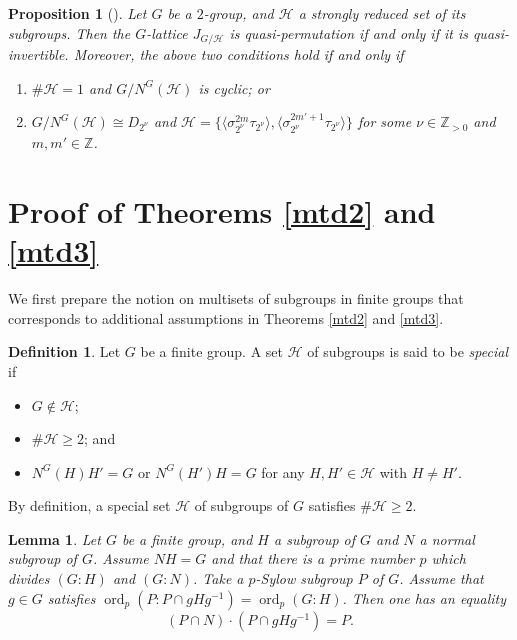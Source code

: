 \documentclass[12pt]{amsart}
\theoremstyle{plain}
\newtheorem{prop}[thm]{Proposition}
\newtheorem{lem}[thm]{Lemma}
\theoremstyle{definition}
\newtheorem{dfn}[thm]{Definition}
\numberwithin{thm}{section}
\numberwithin{equation}{section}
\newcommand{\Zpn}{\mathbb{Z}_{>0}}
\newcommand{\Z}{\mathbb{Z}}
\newcommand{\cH}{\mathcal{H}}
\DeclareMathOperator{\ord}{ord}
\begin{document}
\begin{prop}[{\cite[Theorem 7.16]{Hasegawa}}]\label{prop:tgqp}
Let $G$ be a $2$-group, and $\cH$ a strongly reduced set of its subgroups. Then the $G$-lattice $J_{G/\cH}$ is quasi-permutation if and only if it is quasi-invertible. Moreover, the above two conditions hold if and only if 
\begin{enumerate}
\item $\#\cH=1$ and $G/N^{G}(\cH)$ is cyclic; or
\item $G/N^{G}(\cH) \cong D_{2^{\nu}}$ and $\cH=\{\langle \sigma_{2^{\nu}}^{2m}\tau_{2^{\nu}} \rangle, \langle \sigma_{2^{\nu}}^{2m'+1}\tau_{2^{\nu}} \rangle\}$ for some $\nu \in \Zpn$ and $m,m'\in \Z$. 
\end{enumerate}
\end{prop}

\section{Proof of Theorems \ref{mtd2} and \ref{mtd3}}\label{sect:pf23}

We first prepare the notion on multisets of subgroups in finite groups that corresponds to additional assumptions in Theorems \ref{mtd2} and \ref{mtd3}. 

\begin{dfn}
Let $G$ be a finite group. A set $\cH$ of subgroups is said to be \emph{special} if 
\begin{itemize}
\item $G\notin \cH$; 
\item $\#\cH \geq 2$; and
\item $N^{G}(H)H'=G$ or $N^{G}(H')H=G$ for any $H,H'\in \cH$ with $H\neq H'$. 
\end{itemize}
\end{dfn}

By definition, a special set $\cH$ of subgroups of $G$ satisfies $\#\cH \geq 2$. 

\begin{lem}\label{lem:gnpi}
Let $G$ be a finite group, and $H$ a subgroup of $G$ and $N$ a normal subgroup of $G$. Assume $NH=G$ and that there is a prime number $p$ which divides $(G:H)$ and $(G:N)$. Take a $p$-Sylow subgroup $P$ of $G$. Assume that $g\in G$ satisfies $\ord_{p}(P:P\cap gHg^{-1})=\ord_{p}(G:H)$. Then one has an equality
\begin{equation*}
    (P\cap N)\cdot (P\cap gHg^{-1})=P. 
\end{equation*}
\end{lem}
\end{document}
